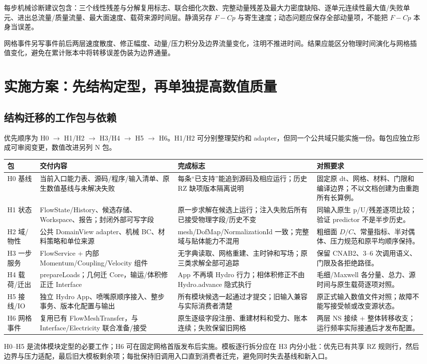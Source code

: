 \documentclass[UTF8,a4paper,11pt,fontset=fandol]{ctexart}
\begin{document}
每步机械诊断建议包含：三个线性残差与分解复用标志、联合细化次数、完整动量残差及最大力密度缺陷、逐单元连续性最大值/失败单元、进出总流量/质量流量、最大面速度、载荷来源时间层。静滴另存 $F-Cp$ 与寄生速度；动态问题应保存全部动量项，不能把 $F-Cp$ 本身当误差。

网格事件另写事件前后两层速度散度、修正幅度、动量/压力积分及边界流量变化，注明不推进时间。结果应能区分物理时间演化与网格插值变化，避免在累计账本中将转移误差伪装为边界通量。

\section{实施方案：先结构定型，再单独提高数值质量}
\subsection{结构迁移的工作包与依赖}
优先顺序为 H0 $\to$ H1/H2 $\to$ H3/H4 $\to$ H5 $\to$ H6。H1/H2 可分别整理契约和 adapter，但同一个公共域只能实施一份。每包应独立形成可审阅变更，数值改进另列 N 包。

\begin{longtable}{@{}P{.10\textwidth}P{.25\textwidth}P{.32\textwidth}P{.27\textwidth}@{}}
\toprule 包 & 交付内容 & 完成标志 & 对照要求\\\midrule\endhead
H0 基线 & 当前入口能力表、源码/程序/输入清单、原生数值基线与未解决失败 & 每条“已支持”能追到源码及相应运行；历史 RZ 缺项版本隔离说明 & 固定原 dt、网格、材料、门限和编译边界；不以文档创建为由重跑所有长算例。\\
H1 状态 & FlowState/History、候选存储、Workspace、报告；封闭外部可写字段 & 原一步求解在候选上运行；注入失败后所有已接受物理字段/历史不变 & 同输入原生 p/U/残差逐项比较；验证 predictor 不是半步历史。\\
H2 域/物性 & 公共 DomainView adapter、机械 BC、材料策略和单位来源 & mesh/DofMap/NormalizationId 一致；完整域与贴体能力不混用 & 粗细面 $D/C$、常量指标、半对偶体、压力规范和原平均顺序保持。\\
H3 一步服务 & FlowService + 内部 Momentum/Coupling/Velocity 组件 & 无字典读取、网格重建、主时钟和写场；原三类求解全部可追踪 & 保留 CNAB2、3--6 次调用语义、门限及各拒绝路径。\\
H4 载荷/迁出 & prepareLoads；几何迁 Core，输运/体积修正迁 Interface & App 不再填 Hydro 行力；相体积修正不由 Hydro.advance 隐式执行 & 毛细/Maxwell 各分量、总力、源时间与原生载荷逐项对照。\\
H5 接线/IO & 独立 Hydro App、喷嘴原顺序接入、整步事务、版本化配置与输出 & 所有模块候选一起通过才提交；旧输入兼容与实际消费者清楚 & 原正式输入数值文件对照；故障不能写接受帧或改变源状态。\\
H6 网格事件 & 复用已有 FlowMeshTransfer，与 Interface/Electricity 联合准备/接受 & 原生逐级字段注册、重建材料和受力、账本连续；失败保留旧网格 & 两层 NS 接续 + 整体转移收支；运行频率实际接通后才发布配置。\\
\bottomrule
\end{longtable}
H0--H5 是流体模块定型的必要工作；H6 可在固定网格首版发布后实施。模板逐行拆分应在 H3 内分小批：优先已有共享 RZ 规则行，然后边界与压力适配，最后旧大模板剩余项；每批保持旧调用入口直到消费者迁完，避免同时失去基线和新入口。
\end{document}
